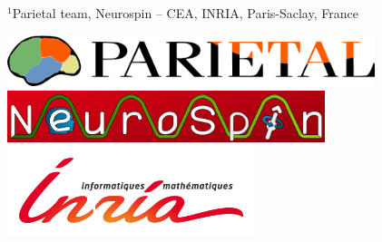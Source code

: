 \documentclass[portrait,a0,final]{a0poster} %
\begin{document}
\begin{minipage}[t]{0.98\linewidth}
\begin{minipage}[t]{0.95\linewidth}
\vspace{0.01\linewidth}
\Large{\textcolor{posterBlack}{\textsf{%
            $^1$Parietal team, Neurospin -- CEA, INRIA, Paris-Saclay, France%
}}}
%
\end{minipage}
\begin{minipage}{0.76\paperwidth}
\vspace{-0.035\linewidth}
\begin{flushright}
\includegraphics[height=15mm, angle=0]{figures/logos/parietal_web_page.png}
\qquad \quad
\includegraphics[height=15mm, angle=0]{figures/logos/neurospin.jpg}
\qquad \quad
\includegraphics[height=26mm, angle=0]{figures/logos/logo-inria2.jpg}
\end{flushright}
\end{minipage} %


\end{minipage}


\vspace{0.03\linewidth}

\centering
\Large %
\sffamily %
\end{document}
